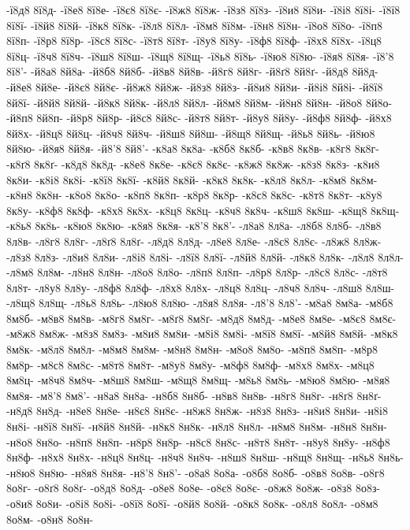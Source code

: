 {-ї8д8
8ї8д-
-ї8е8
8ї8е-
-ї8є8
8ї8є-
-ї8ж8
8ї8ж-
-ї8з8
8ї8з-
-ї8и8
8ї8и-
-ї8і8
8ї8і-
-ї8ї8
8ї8ї-
-ї8й8
8ї8й-
-ї8к8
8ї8к-
-ї8л8
8ї8л-
-ї8м8
8ї8м-
-ї8н8
8ї8н-
-ї8о8
8ї8о-
-ї8п8
8ї8п-
-ї8р8
8ї8р-
-ї8с8
8ї8с-
-ї8т8
8ї8т-
-ї8у8
8ї8у-
-ї8ф8
8ї8ф-
-ї8х8
8ї8х-
-ї8ц8
8ї8ц-
-ї8ч8
8ї8ч-
-ї8ш8
8ї8ш-
-ї8щ8
8ї8щ-
-ї8ь8
8ї8ь-
-ї8ю8
8ї8ю-
-ї8я8
8ї8я-
-ї8'8
8ї8'-
-й8а8
8й8а-
-й8б8
8й8б-
-й8в8
8й8в-
-й8г8
8й8г-
-й8ґ8
8й8ґ-
-й8д8
8й8д-
-й8е8
8й8е-
-й8є8
8й8є-
-й8ж8
8й8ж-
-й8з8
8й8з-
-й8и8
8й8и-
-й8і8
8й8і-
-й8ї8
8й8ї-
-й8й8
8й8й-
-й8к8
8й8к-
-й8л8
8й8л-
-й8м8
8й8м-
-й8н8
8й8н-
-й8о8
8й8о-
-й8п8
8й8п-
-й8р8
8й8р-
-й8с8
8й8с-
-й8т8
8й8т-
-й8у8
8й8у-
-й8ф8
8й8ф-
-й8х8
8й8х-
-й8ц8
8й8ц-
-й8ч8
8й8ч-
-й8ш8
8й8ш-
-й8щ8
8й8щ-
-й8ь8
8й8ь-
-й8ю8
8й8ю-
-й8я8
8й8я-
-й8'8
8й8'-
-к8а8
8к8а-
-к8б8
8к8б-
-к8в8
8к8в-
-к8г8
8к8г-
-к8ґ8
8к8ґ-
-к8д8
8к8д-
-к8е8
8к8е-
-к8є8
8к8є-
-к8ж8
8к8ж-
-к8з8
8к8з-
-к8и8
8к8и-
-к8і8
8к8і-
-к8ї8
8к8ї-
-к8й8
8к8й-
-к8к8
8к8к-
-к8л8
8к8л-
-к8м8
8к8м-
-к8н8
8к8н-
-к8о8
8к8о-
-к8п8
8к8п-
-к8р8
8к8р-
-к8с8
8к8с-
-к8т8
8к8т-
-к8у8
8к8у-
-к8ф8
8к8ф-
-к8х8
8к8х-
-к8ц8
8к8ц-
-к8ч8
8к8ч-
-к8ш8
8к8ш-
-к8щ8
8к8щ-
-к8ь8
8к8ь-
-к8ю8
8к8ю-
-к8я8
8к8я-
-к8'8
8к8'-
-л8а8
8л8а-
-л8б8
8л8б-
-л8в8
8л8в-
-л8г8
8л8г-
-л8ґ8
8л8ґ-
-л8д8
8л8д-
-л8е8
8л8е-
-л8є8
8л8є-
-л8ж8
8л8ж-
-л8з8
8л8з-
-л8и8
8л8и-
-л8і8
8л8і-
-л8ї8
8л8ї-
-л8й8
8л8й-
-л8к8
8л8к-
-л8л8
8л8л-
-л8м8
8л8м-
-л8н8
8л8н-
-л8о8
8л8о-
-л8п8
8л8п-
-л8р8
8л8р-
-л8с8
8л8с-
-л8т8
8л8т-
-л8у8
8л8у-
-л8ф8
8л8ф-
-л8х8
8л8х-
-л8ц8
8л8ц-
-л8ч8
8л8ч-
-л8ш8
8л8ш-
-л8щ8
8л8щ-
-л8ь8
8л8ь-
-л8ю8
8л8ю-
-л8я8
8л8я-
-л8'8
8л8'-
-м8а8
8м8а-
-м8б8
8м8б-
-м8в8
8м8в-
-м8г8
8м8г-
-м8ґ8
8м8ґ-
-м8д8
8м8д-
-м8е8
8м8е-
-м8є8
8м8є-
-м8ж8
8м8ж-
-м8з8
8м8з-
-м8и8
8м8и-
-м8і8
8м8і-
-м8ї8
8м8ї-
-м8й8
8м8й-
-м8к8
8м8к-
-м8л8
8м8л-
-м8м8
8м8м-
-м8н8
8м8н-
-м8о8
8м8о-
-м8п8
8м8п-
-м8р8
8м8р-
-м8с8
8м8с-
-м8т8
8м8т-
-м8у8
8м8у-
-м8ф8
8м8ф-
-м8х8
8м8х-
-м8ц8
8м8ц-
-м8ч8
8м8ч-
-м8ш8
8м8ш-
-м8щ8
8м8щ-
-м8ь8
8м8ь-
-м8ю8
8м8ю-
-м8я8
8м8я-
-м8'8
8м8'-
-н8а8
8н8а-
-н8б8
8н8б-
-н8в8
8н8в-
-н8г8
8н8г-
-н8ґ8
8н8ґ-
-н8д8
8н8д-
-н8е8
8н8е-
-н8є8
8н8є-
-н8ж8
8н8ж-
-н8з8
8н8з-
-н8и8
8н8и-
-н8і8
8н8і-
-н8ї8
8н8ї-
-н8й8
8н8й-
-н8к8
8н8к-
-н8л8
8н8л-
-н8м8
8н8м-
-н8н8
8н8н-
-н8о8
8н8о-
-н8п8
8н8п-
-н8р8
8н8р-
-н8с8
8н8с-
-н8т8
8н8т-
-н8у8
8н8у-
-н8ф8
8н8ф-
-н8х8
8н8х-
-н8ц8
8н8ц-
-н8ч8
8н8ч-
-н8ш8
8н8ш-
-н8щ8
8н8щ-
-н8ь8
8н8ь-
-н8ю8
8н8ю-
-н8я8
8н8я-
-н8'8
8н8'-
-о8а8
8о8а-
-о8б8
8о8б-
-о8в8
8о8в-
-о8г8
8о8г-
-о8ґ8
8о8ґ-
-о8д8
8о8д-
-о8е8
8о8е-
-о8є8
8о8є-
-о8ж8
8о8ж-
-о8з8
8о8з-
-о8и8
8о8и-
-о8і8
8о8і-
-о8ї8
8о8ї-
-о8й8
8о8й-
-о8к8
8о8к-
-о8л8
8о8л-
-о8м8
8о8м-
-о8н8
8о8н-
}
